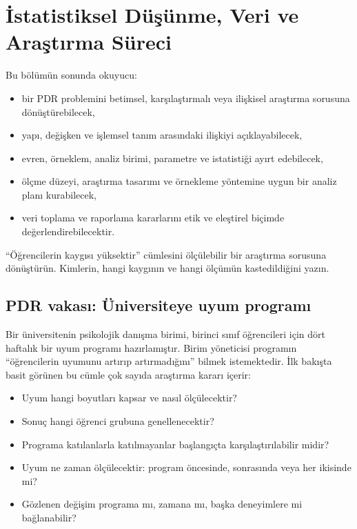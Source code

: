 \chapter{İstatistiksel Düşünme, Veri ve Araştırma Süreci}
\label{ch:research}
\label{ch:population-data}

\begin{hedefler}
Bu bölümün sonunda okuyucu:
\begin{itemize}
  \item bir PDR problemini betimsel, karşılaştırmalı veya ilişkisel araştırma sorusuna dönüştürebilecek,
  \item yapı, değişken ve işlemsel tanım arasındaki ilişkiyi açıklayabilecek,
  \item evren, örneklem, analiz birimi, parametre ve istatistiği ayırt edebilecek,
  \item ölçme düzeyi, araştırma tasarımı ve örnekleme yöntemine uygun bir analiz planı kurabilecek,
  \item veri toplama ve raporlama kararlarını etik ve eleştirel biçimde değerlendirebilecektir.
\end{itemize}
\end{hedefler}

\begin{hazirlik}
``Öğrencilerin kaygısı yüksektir'' cümlesini ölçülebilir bir araştırma
sorusuna dönüştürün. Kimlerin, hangi kaygının ve hangi ölçümün kastedildiğini
yazın.
\end{hazirlik}

\section{PDR vakası: Üniversiteye uyum programı}

Bir üniversitenin psikolojik danışma birimi, birinci sınıf öğrencileri için
dört haftalık bir uyum programı hazırlamıştır. Birim yöneticisi programın
``öğrencilerin uyumunu artırıp artırmadığını'' bilmek istemektedir. İlk bakışta
basit görünen bu cümle çok sayıda araştırma kararı içerir:

\begin{itemize}
  \item Uyum hangi boyutları kapsar ve nasıl ölçülecektir?
  \item Sonuç hangi öğrenci grubuna genellenecektir?
  \item Programa katılanlarla katılmayanlar başlangıçta karşılaştırılabilir midir?
  \item Uyum ne zaman ölçülecektir: program öncesinde, sonrasında veya her ikisinde mi?
  \item Gözlenen değişim programa mı, zamana mı, başka deneyimlere mi bağlanabilir?
\end{itemize}

